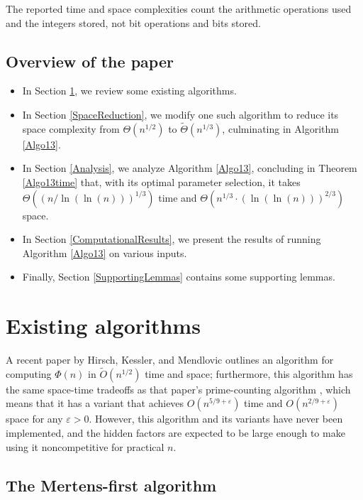 \documentclass[12pt]{article}
\newcommand{\softO}[0]{\widetilde{O}}
\newcommand{\softTheta}[0]{\widetilde{\Theta}}
\begin{document}
The reported time and space complexities count the arithmetic operations used and the integers stored, not bit operations and bits stored.

\subsection{Overview of the paper}

\begin{itemize}
\item In Section \ref{ExistingAlgorithms}, we review some existing algorithms.
\item In Section \ref{SpaceReduction}, we modify one such algorithm to reduce its space complexity from $\Theta(n^{1/2})$ to $\softTheta(n^{1/3})$, culminating in Algorithm \ref{Algo13}.
\item In Section \ref{Analysis}, we analyze Algorithm \ref{Algo13}, concluding in Theorem \ref{Algo13time} that, with its optimal parameter selection, it takes $\Theta\left( (n / \ln(\ln(n)))^{1/3} \right)$ time and $\Theta\left(n^{1/3} \cdot (\ln(\ln(n)))^{2/3} \right)$ space.
\item In Section \ref{ComputationalResults}, we present the results of running Algorithm \ref{Algo13} on various inputs.
\item Finally, Section \ref{SupportingLemmas} contains some supporting lemmas.
\end{itemize}

\section{Existing algorithms} \label{ExistingAlgorithms}

A recent paper by Hirsch, Kessler, and Mendlovic \cite[\S 5.6]{HKM2024} outlines an algorithm for computing $\Phi(n)$ in $\softO(n^{1/2})$ time and space; furthermore, this algorithm has the same space-time tradeoffs as that paper's prime-counting algorithm \cite{HKM2025}, which means that it has a variant that achieves $O(n^{5/9+\varepsilon})$ time and $O(n^{2/9+\varepsilon})$ space for any $\varepsilon>0$.  However, this algorithm and its variants have never been implemented, and the hidden factors are expected to be large enough to make using it noncompetitive for practical $n$.

\subsection{The Mertens-first algorithm}
\end{document}
